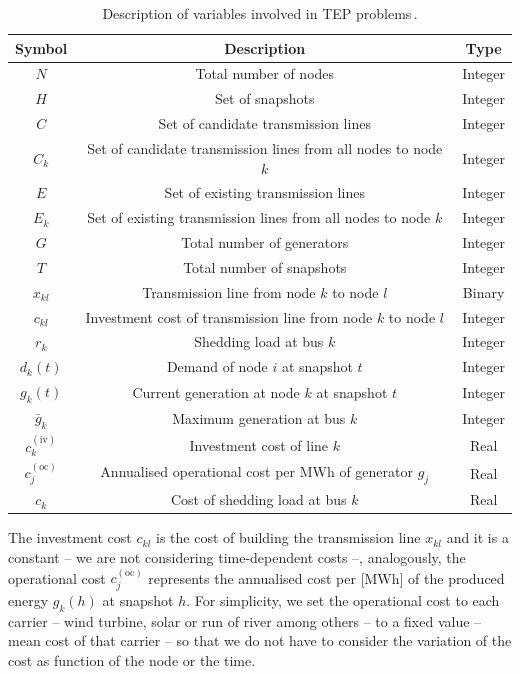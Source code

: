 \begin{table}[H]
\centering
\begin{tabular}{|c||c|c|} 
 \hline	
 \textbf{Symbol} & \textbf{Description} & \textbf{Type} \\
 \hline	
 $N$ & Total number of nodes & Integer\\
  \hline	
  $H$ & Set of snapshots & Integer\\
  \hline
 $C$ & Set of candidate transmission lines & Integer\\
    \hline	
 $C_{k}$ & Set of candidate transmission lines from all nodes to node $k$ & Integer\\
  \hline	
 $E$ & Set of existing transmission lines & Integer\\
   \hline	
 $E_{k}$ & Set of existing transmission lines from all nodes to node $k$ & Integer\\
  \hline	
 $G$ & Total number of generators & Integer\\
  \hline	
 $T$ & Total number of snapshots & Integer\\
  \hline	
 $x_{kl}$ & Transmission line from node $k$ to node $l$ & Binary\\
  \hline
  $c_{kl}$ & Investment cost of transmission line from node $k$ to node $l$ & Integer\\
  \hline
  $r_{k}$ & Shedding load at bus $k$ & Integer\\
  \hline	
 $d_{k}(t)$ & Demand of node $i$ at snapshot $t$ & Integer\\
  \hline	
 $g_{k}(t)$ & Current generation at node $k$ at snapshot $t$ & Integer\\
  \hline	
 $\bar{g}_{k}$ & Maximum generation at bus $k$ & Integer\\
  \hline	
 $c_{k}^{(\text{iv})}$ & Investment cost of line $k$ & Real\\
  \hline	
  $c_{j}^{(\text{oc})}$ & Annualised operational cost per MWh of generator $g_{j}$ & Real\\
  \hline
  $c_{k}$ & Cost of shedding load at bus $k$ & Real\\
  \hline
\end{tabular}
\caption{Description of variables involved in TEP problems\,\cite{Dilwali2016}.}
\label{table:TEPNomenclature}
\end{table}
The investment cost $c_{kl}$ is the cost of building the transmission line $x_{kl}$ and it is a constant -- we are not considering time-dependent costs --, analogously, the operational cost $c_{j}^{(\text{oc})}$ represents the annualised cost per [MWh] of the produced energy $g_{k}(h)$ at snapshot $h$. For simplicity, we set the operational cost to each carrier -- wind turbine, solar or run of river among others -- to a fixed value -- mean cost of that carrier -- so that we do not have to consider the variation of the cost as function of the node or the time.\\\\
